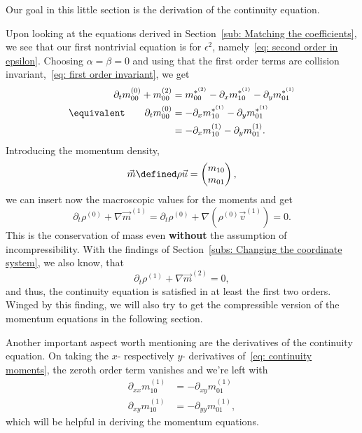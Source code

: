 Our goal in this little section is the derivation of the continuity equation.

Upon looking at the equations derived in Section~\ref{sub: Matching the coefficients}, we see that our first nontrivial equation is for $\epsilon^2$, namely~\eqref{eq: second order in epsilon}.
Choosing $\alpha=\beta=0$ and using that the first order terms are collision invariant,~\eqref{eq: first order invariant}, we get
\begin{align}
  \nonumber
  \partial_t m_{00}^{(0)} + m_{00}^{(2)} & =  m_{00}^{*^{(2)}} - \partial_x m_{10}^{*^{(1)}} - \partial_y m_{01}^{*^{(1)}} \\
  \equivalent \qquad \partial_t m_{00}^{(0)} & =  - \partial_x m_{10}^{*^{(1)}} - \partial_y m_{01}^{*^{(1)}} \nonumber
  \\
  & =  - \partial_x m_{10}^{(1)} - \partial_y m_{01}^{(1)}.
  \label{eq: continuity moments}
\end{align}
Introducing the momentum density,
\begin{equation}
  \vec{m} \defined \rho \vec{u} = \begin{pmatrix}m_{10} \\m_{01}  \end{pmatrix},
\end{equation}
we can insert now the macroscopic values for the moments and get
\begin{equation}
  \partial_t \rho^{(0)} + \nabla \vec{m}^{(1)} =
  \partial_t \rho^{(0)} + \nabla (\rho^{(0)} \vec{v}^{(1)}) = 0.
\end{equation}
This is the conservation of mass even \textbf{without} the assumption of incompressibility.
With the findings of Section~\ref{subs: Changing the coordinate system}, we also know, that
\begin{equation}
  \partial_t \rho^{(1)} + \nabla \vec{m}^{(2)} = 0,
\end{equation}
and thus, the continuity equation is satisfied in at least the first two orders.
Winged by this finding, we will also try to get the compressible version of the momentum equations in the following section.

Another important aspect worth mentioning are the derivatives of the continuity equation.
On taking the $x$- respectively $y$- derivatives of~\eqref{eq: continuity moments}, the zeroth order term vanishes and we're left with
\begin{align}
  \label{eq: continuity derivative x}
  \partial_{xx} m_{10}^{(1)} & = - \partial_{xy} m_{01}^{(1)}\\
  \label{eq: continuity derivative y}
  \partial_{xy} m_{10}^{(1)} & = - \partial_{yy} m_{01}^{(1)},
\end{align}
which will be helpful in deriving the momentum equations.
